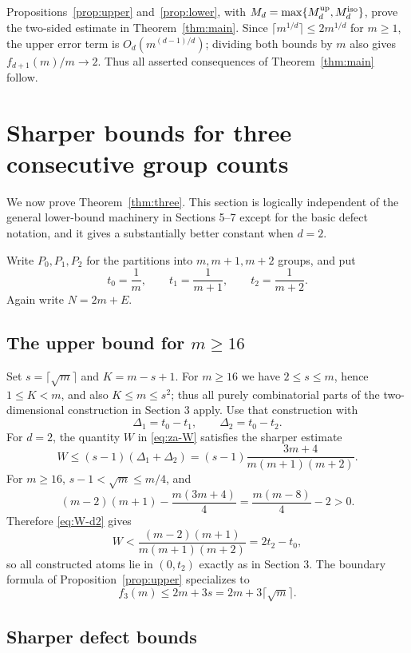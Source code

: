 \documentclass[11pt]{article}
\theoremstyle{definition}
\newcommand{\1}{\mathbf{1}}
\begin{document}
Propositions~\ref{prop:upper} and~\ref{prop:lower}, with $M_d=\max\{M_d^{\rm up},M_d^{\rm iso}\}$, prove the two-sided estimate in Theorem~\ref{thm:main}.  Since $\lceil m^{1/d}\rceil\le2m^{1/d}$ for $m\ge1$, the upper error term is $O_d(m^{(d-1)/d})$; dividing both bounds by $m$ also gives $f_{d+1}(m)/m\to2$.  Thus all asserted consequences of Theorem~\ref{thm:main} follow.

\section{Sharper bounds for three consecutive group counts}

We now prove Theorem~\ref{thm:three}.  This section is logically independent of the general lower-bound machinery in Sections 5--7 except for the basic defect notation, and it gives a substantially better constant when $d=2$.

Write $P_0,P_1,P_2$ for the partitions into $m,m+1,m+2$ groups, and put
\[
  t_0=\frac1m,
  \qquad
  t_1=\frac1{m+1},
  \qquad
  t_2=\frac1{m+2}.
\]
Again write $N=2m+E$.

\subsection{The upper bound for $m\ge16$}

Set $s=\lceil\sqrt m\rceil$ and $K=m-s+1$.  For $m\ge16$ we have $2\le s\le m$, hence $1\le K<m$, and also $K\le m\le s^2$; thus all purely combinatorial parts of the two-dimensional construction in Section 3 apply.  Use that construction with
\[
  \Delta_1=t_0-t_1,
  \qquad
  \Delta_2=t_0-t_2.
\]
For $d=2$, the quantity $W$ in \eqref{eq:za-W} satisfies the sharper estimate
\begin{equation}\label{eq:W-d2}
  W\le(s-1)(\Delta_1+\Delta_2)
  =(s-1)\frac{3m+4}{m(m+1)(m+2)}.
\end{equation}
For $m\ge16$, $s-1<\sqrt m\le m/4$, and
\[
  (m-2)(m+1)-\frac{m(3m+4)}4
  =\frac{m(m-8)}4-2>0.
\]
Therefore \eqref{eq:W-d2} gives
\[
  W<\frac{(m-2)(m+1)}{m(m+1)(m+2)}
  =2t_2-t_0,
\]
so all constructed atoms lie in $(0,t_2)$ exactly as in Section 3.  The boundary formula of Proposition~\ref{prop:upper} specializes to
\[
  f_3(m)\le2m+3s=2m+3\lceil\sqrt m\rceil.
\]

\subsection{Sharper defect bounds}
\end{document}
